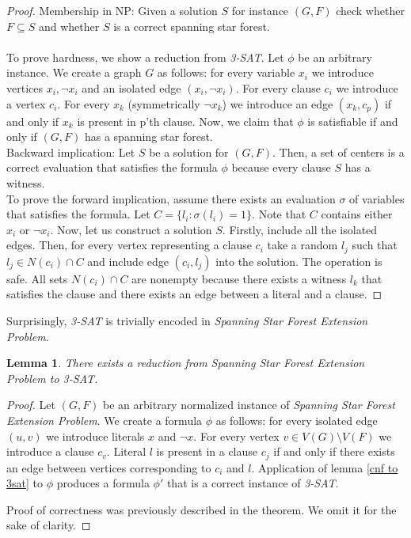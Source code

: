 \documentclass[en]{pracamgr}
\newtheorem{lemma}{Lemma}
\newcommand{\ssf}{spanning star forest}
\newcommand{\ssfe}{\emph{Spanning Star Forest Extension Problem}}
\newcommand{\tsat}{\emph{3-SAT}}
\begin{document}
\begin{proof}
	Membership in NP: Given a solution $S$ for instance $(G,F)$ check whether $F \subseteq S$ and whether $S$ is a correct \ssf{}.
	\\\\
	To prove hardness, we show a reduction from \tsat{}. Let $\phi$ be an arbitrary instance. We create a graph $G$ as follows: for every variable $x_i$ we introduce vertices $x_i,\neg x_i$ and an isolated edge $(x_i,\neg x_i)$. For every clause $c_i$ we introduce a vertex $c_i$. For every $x_k$ (symmetrically $\neg x_k$) we introduce an edge $(x_k,c_p)$ if and only if $x_k$ is present in p'th clause. Now, we claim that $\phi$ is satisfiable if and only if $(G, F)$ has a \ssf{}. \\
	Backward implication: Let $S$ be a solution for $(G,F)$. Then, a set of centers is a correct evaluation that satisfies the formula $\phi$ because every clause $S$ has a witness.\\
	To prove the forward implication, assume there exists an evaluation $\sigma$ of variables that satisfies the formula. Let $C = \{l_i: \sigma(l_i) = 1\} $. Note that $C$ contains either $x_i$ or $\neg x_i$. Now, let us construct a solution $S$. Firstly, include all the isolated edges. Then, for every vertex representing a clause $c_i$ take a random $l_j$ such that $l_j \in N(c_i) \cap C$ and include edge $(c_i, l_j)$ into the solution. The operation is safe. All sets $ N(c_i) \cap C$ are nonempty because there exists a witness $l_k$ that satisfies the clause and there exists an edge between a literal and a clause.
\end{proof}

Surprisingly, \tsat{} is trivially encoded in \ssfe{}.

 \label{cnf to 3sat}
\begin{lemma}
	There exists a reduction from \ssfe{} to \tsat.
\end{lemma}

\begin{proof}
	Let $(G,F)$ be an arbitrary normalized instance of \ssfe{}. We create a formula $\phi$ as follows: for every isolated edge $(u,v)$ we introduce literals $x$ and $\neg x$. For every vertex $v \in V(G)\setminus V(F)$ we introduce a clause $c_v$. Literal $l$ is present in a clause $c_j$ if and only if there exists an edge between vertices corresponding to $c_i$ and $l$. Application of lemma \ref{cnf to 3sat} to $\phi$ produces a formula $\phi'$ that is a correct instance of \tsat.
	
	Proof of correctness was previously described in the theorem. We omit it for the sake of clarity.
\end{proof}
\end{document}
